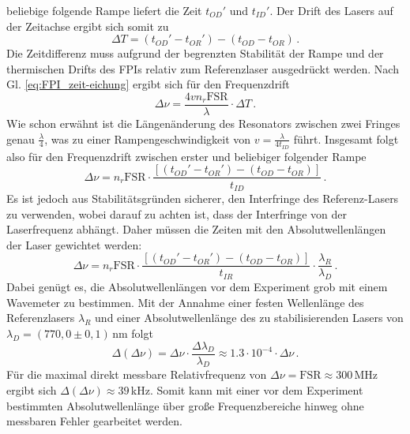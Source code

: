 beliebige folgende Rampe liefert die Zeit $t_{OD}'$ und $t_{ID}'$. Der Drift des Lasers auf der
Zeitachse ergibt sich somit zu
\begin{equation}\label{eq:FPI_zeitdrift}
	\Delta T=\left(t_{OD}'-t_{OR}'\right)-\left(t_{OD}-t_{OR}\right)\,.
\end{equation}
Die Zeitdifferenz muss aufgrund der begrenzten Stabilität der Rampe und der
thermischen Drifts des FPIs relativ zum Referenzlaser ausgedrückt werden. Nach
Gl.
\eqref{eq:FPI_zeit-eichung} ergibt sich für den Frequenzdrift
\begin{equation}\label{eq:FPI_frequenzdrift_01}
	\Delta\nu=\frac{4vn_r\text{FSR}}{\lambda}\cdot\Delta T\,.
\end{equation}
Wie schon erwähnt ist die Längenänderung des Resonators zwischen zwei Fringes
genau $\frac{\lambda}{4}$, was zu einer Rampengeschwindigkeit von
$v=\frac{\lambda}{4t_{ID}}$ führt. Insgesamt folgt also für den Frequenzdrift
zwischen erster und beliebiger folgender Rampe
\begin{equation}\label{eq:FPI_frequenzdrift_02}
	\Delta\nu=n_r\text{FSR}\cdot\frac{\left[\left(t_{OD}'-t_{OR}'\right)-\left(t_{OD}-t_{OR}\right)\right]}{t_{ID}}\,.
\end{equation}
Es ist jedoch aus Stabilitätsgründen sicherer, den Interfringe des
Referenz-Lasers zu verwenden, wobei darauf zu achten ist, dass der Interfringe
von der Laserfrequenz abhängt. Daher müssen die Zeiten mit den
Absolutwellenlängen der Laser gewichtet werden:
\begin{equation}\label{eq:FPI_frequenzdrift_03}
	\Delta\nu=n_r\text{FSR}\cdot\frac{\left[\left(t_{OD}'-t_{OR}'\right)-\left(t_{OD}-t_{OR}\right)\right]}{t_{IR}}\cdot\frac{\lambda_R}{\lambda_D}\,.
\end{equation}
Dabei genügt es, die Absolutwellenlängen vor dem Experiment grob mit einem
Wavemeter zu bestimmen. Mit der Annahme einer festen Wellenlänge
des Referenzlasers $\lambda_R$ und einer Absolutwellenlänge
des zu stabilisierenden Lasers von $\lambda_D=(770,0\pm0,1)\,$nm folgt
\begin{equation}\label{eq:FPI_frequenzdrift_fehler}
	\Delta(\Delta\nu)=\Delta\nu\cdot\frac{\Delta\lambda_D}{\lambda_D}\approx1.3\cdot10^{-4}\cdot\Delta\nu\,.
\end{equation}
Für die maximal direkt messbare Relativfrequenz von
$\Delta\nu=\text{FSR}\approx300\,$MHz ergibt sich
$\Delta(\Delta\nu)\approx39\,$kHz. Somit kann mit einer vor
dem Experiment bestimmten Absolutwellenlänge über große Frequenzbereiche hinweg
ohne messbaren Fehler gearbeitet werden.\par
